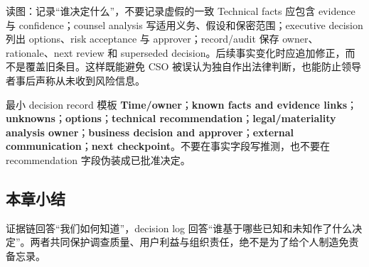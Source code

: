 
\begin{knowledgebox}{读图：记录“谁决定什么”，不要记录虚假的一致}
Technical facts 应包含 evidence 与 confidence；counsel analysis 写适用义务、假设和保密范围；executive decision 列出 options、risk acceptance 与 approver；record/audit 保存 owner、rationale、next review 和 superseded decision。后续事实变化时应追加修正，而不是覆盖旧条目。这样既能避免 CSO 被误认为独自作出法律判断，也能防止领导者事后声称从未收到风险信息。
\end{knowledgebox}

\begin{importantbox}{最小 decision record 模板}
\textbf{Time/owner}；\textbf{known facts and evidence links}；\textbf{unknowns}；\textbf{options}；\textbf{technical recommendation}；\textbf{legal/materiality analysis owner}；\textbf{business decision and approver}；\textbf{external communication}；\textbf{next checkpoint}。不要在事实字段写推测，也不要在 recommendation 字段伪装成已批准决定。
\end{importantbox}

\subsection{本章小结}

证据链回答“我们如何知道”，decision log 回答“谁基于哪些已知和未知作了什么决定”。两者共同保护调查质量、用户利益与组织责任，绝不是为了给个人制造免责备忘录。

